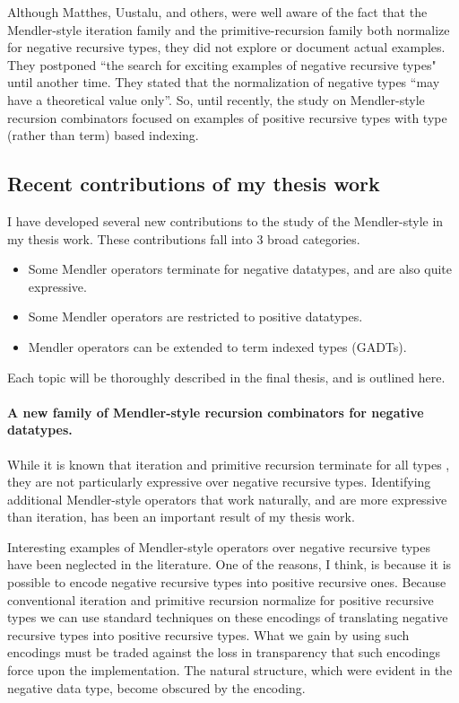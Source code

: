 Although Matthes, Uustalu, and others, were well aware of the fact that
the Mendler-style iteration family and the primitive-recursion family both
normalize for negative recursive types, they did not explore or document actual
examples. They postponed ``the search for exciting examples of negative
recursive types" until another time. They stated that the normalization
of negative types ``may have a theoretical value
only''\cite{UusVen99}. So, until recently, the study on Mendler-style recursion
combinators focused on examples of positive recursive types with type (rather than term) based indexing.

\subsection{Recent contributions of my thesis work}
I have developed several new contributions to the study of the Mendler-style
in my thesis work. These contributions fall into 3 broad categories.
\begin{itemize}
\item Some Mendler operators terminate for negative datatypes, and are also quite expressive.
\item Some Mendler operators are restricted to positive datatypes.
\item Mendler operators can be extended to term indexed types (GADTs).
\end{itemize}
Each topic will be thoroughly described in the final thesis, and is outlined here.


\paragraph{A new family of Mendler-style recursion combinators for negative datatypes.}

While it is known that iteration and primitive recursion terminate for all types
\cite{AbeMatUus05,AbeMat04}, they are not particularly expressive over negative
recursive types. Identifying additional Mendler-style operators that work
naturally, and are more expressive than iteration, has been an important result
of my thesis work.

Interesting examples of Mendler-style operators over negative recursive types
have been neglected in the literature. One of the reasons, I think, is because
it is possible to encode negative recursive types into positive recursive ones. Because conventional iteration and primitive recursion normalize for
positive recursive types we can use standard techniques on these encodings
of translating negative recursive types into positive recursive types.
What we gain by using such encodings must be traded against the loss in
transparency that such encodings force upon the implementation. The natural
structure, which were evident in the negative data type, become obscured by
the encoding.

